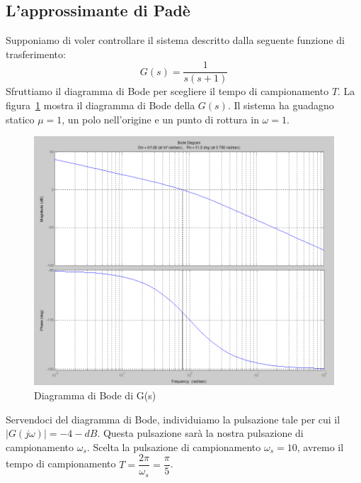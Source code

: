 \documentclass[a4paper]{report}
\begin{document}
\subsection{L'approssimante di Pad\`e}
Supponiamo di voler controllare il sistema descritto dalla seguente
funzione di trasferimento:
\[
G(s) = \dfrac{1}{s(s + 1)}
\]
Sfruttiamo il diagramma di Bode per scegliere il tempo di
campionamento $T$. La figura~\ref{fig:pade} mostra il diagramma di
Bode della $G(s)$. Il sistema ha guadagno statico $\mu = 1$, un polo
nell'origine e un punto di rottura in $\omega = 1$.
\begin{figure}[!h]
  \begin{center}
    \includegraphics[scale=0.3]{./figures/pade.png}
    \caption{Diagramma di Bode di G(s)}\label{fig:pade}
  \end{center}
\end{figure}
Servendoci del diagramma di Bode, individuiamo la pulsazione tale per
cui il $|G(j \omega)| = -4-dB$. Questa pulsazione sar\`a la nostra
pulsazione di campionamento $\omega_s$. Scelta la pulsazione di
campionamento $\omega_s = 10$, avremo il tempo di campionamento $T =
\dfrac{2 \pi}{\omega_s} = \dfrac{\pi}{5}$.
\end{document}
